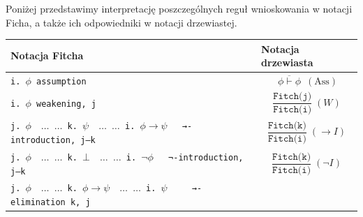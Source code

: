 \documentclass{article}
\begin{document}
Poniżej przedstawimy interpretację poszczególnych reguł wnioskowania w notacji Ficha, a także ich odpowiedniki w notacji drzewiastej.
\begin{center}
\small
\begin{longtable}{|p{}|p{}|}
\hline
\textbf{Notacja Fitcha} & \textbf{Notacja drzewiasta} \\
\hline

\texttt{i. $\phi$    assumption}
&
$$\displaystyle
\overline{\ \texttt{$\phi\vdash\phi$}\ }\;(\mathrm{Ass})
$$
\\
\hline
\texttt{i. $\phi$ \quad   weakening, j} %
&
$$\displaystyle
\frac{\texttt{Fitch(j)}}{\texttt{Fitch(i)}}\;(W)
$$
\\
\hline
\texttt{j. $\phi \quad  \dots$
     \newline
     $\dots$
     \newline
     k. $\psi \quad \dots$ 
     \newline
     $\dots$
     \newline
     i. $\phi \to \psi \quad$ →-introduction, j–k
     }





&
$$\displaystyle
\frac{\texttt{Fitch(k)}}{\texttt{Fitch(i)}}\;(\to I)
$$
\\
\hline

\texttt{j. $\phi \quad  \dots$
     \newline
     $\dots$
     \newline
     k. $\bot \quad \dots$ 
     \newline
     $\dots$
     \newline
     i. $\neg \phi \quad$ ¬-introduction, j–k
     }





&
$$\displaystyle
\frac{\texttt{Fitch(k)}}{\texttt{Fitch(i)}}\;(\neg I)
$$
\\









\hline

\texttt{j. $\phi \quad  \dots$
     \newline
     $\dots$
     \newline
     k.  $\phi \to \psi \quad  \dots$
     \newline
     $\dots$
     \newline
     i. $\psi \qquad$ →-elimination k, j
     }






\end{longtable}
\end{center}
\end{document}
